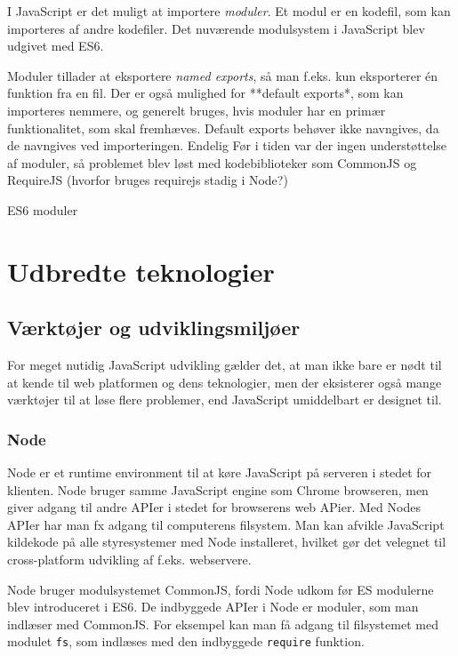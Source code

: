 \documentclass[]{article}
\begin{document}
I JavaScript er det muligt at importere \emph{moduler}. Et modul er en
kodefil, som kan importeres af andre kodefiler. Det nuværende
modulsystem i JavaScript blev udgivet med ES6.

Moduler tillader at eksportere \emph{named exports}, så man f.eks. kun
eksporterer én funktion fra en fil. Der er også mulighed for **default
exports*, som kan importeres nemmere, og generelt bruges, hvis moduler
har en primær funktionalitet, som skal fremhæves. Default exports
behøver ikke navngives, da de navngives ved importeringen. Endelig Før i
tiden var der ingen understøttelse af moduler, så problemet blev løst
med kodebiblioteker som CommonJS og RequireJS (hvorfor bruges requirejs
stadig i Node?)

ES6 moduler

\hypertarget{udbredte-teknologier}{%
\section{Udbredte teknologier}\label{udbredte-teknologier}}

\hypertarget{vuxe6rktuxf8jer-og-udviklingsmiljuxf8er}{%
\subsection{Værktøjer og
udviklingsmiljøer}\label{vuxe6rktuxf8jer-og-udviklingsmiljuxf8er}}

For meget nutidig JavaScript udvikling gælder det, at man ikke bare er
nødt til at kende til web platformen og dens teknologier, men der
eksisterer også mange værktøjer til at løse flere problemer, end
JavaScript umiddelbart er designet til.

\hypertarget{node}{%
\subsubsection{Node}\label{node}}

Node er et runtime environment til at køre JavaScript på serveren i
stedet for klienten. Node bruger samme JavaScript engine som Chrome
browseren, men giver adgang til andre APIer i stedet for browserens web
APier. Med Nodes APIer har man fx adgang til computerens filsystem. Man
kan afvikle JavaScript kildekode på alle styresystemer med Node
installeret, hvilket gør det velegnet til cross-platform udvikling af
f.eks. webservere.

Node bruger modulsystemet CommonJS, fordi Node udkom før ES modulerne
blev introduceret i ES6. De indbyggede APIer i Node er moduler, som man
indlæser med CommonJS. For eksempel kan man få adgang til filsystemet
med modulet \texttt{fs}, som indlæses med den indbyggede
\texttt{require} funktion.
\end{document}
